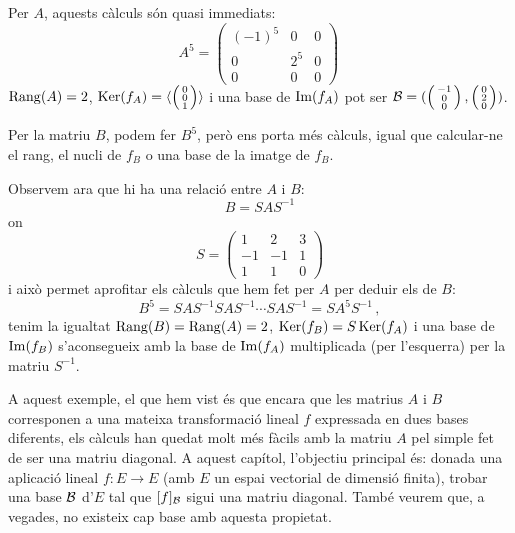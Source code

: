 \documentclass[
  11pt,
]{book}
\numberwithin{dummy}{section}
\theoremstyle{maincolornumbox}
\theoremstyle{blacknumex}
\theoremstyle{blacknumbox}
\theoremstyle{maincolornum}
\newlength\esp
\begin{document}
Per \(A\), aquests càlculs són quasi immediats: \[A^5=\begin{pmatrix}
(-1)^5 & 0 & 0 \\ 0 & 2^5 & 0 \\ 0 & 0 & 0
\end{pmatrix} \,\] \(\operatorname{Rang}(A)=2\),
\(\operatorname{Ker}(f_A)=\langle \left( \begin{smallmatrix} 0 \\ 0 \\ 1 \end{smallmatrix} \right) \rangle\)
i una base de \(\operatorname{Im}(f_A)\) pot ser
\(\mathcal{B}=( \left( \begin{smallmatrix} -1 \\ 0 \\ 0 \end{smallmatrix} \right) , \left( \begin{smallmatrix} 0 \\ 2 \\ 0 \end{smallmatrix} \right))\).

Per la matriu \(B\), podem fer \(B^5\), però ens porta més càlculs, igual
que calcular-ne el rang, el nucli de \(f_B\) o una base de la imatge de
\(f_B\).

Observem ara que hi ha una relació entre \(A\) i \(B\): \[B=S A S^{-1}\] on
\[S=\begin{pmatrix} 1 & 2 & 3 \\ -1 & -1 & 1 \\ 1 & 1 & 0
\end{pmatrix}\] i això permet aprofitar els càlculs que hem fet per \(A\)
per deduir els de \(B\):
\[B^5=S A S^{-1} S A S^{-1} \cdots S A S^{-1}=S A^5 S^{-1} \, ,\] tenim
la igualtat \(\operatorname{Rang}(B)=\operatorname{Rang}(A)=2\), \(\operatorname{Ker}(f_B)=S\operatorname{Ker}(f_A)\) i una base de
\(\operatorname{Im}(f_B)\) s'aconsegueix amb la base de \(\operatorname{Im}(f_A)\) multiplicada (per
l'esquerra) per la matriu \(S^{-1}\).

A aquest exemple, el que hem vist és que encara que les matrius \(A\) i
\(B\) corresponen a una mateixa transformació lineal \(f\) expressada en
dues bases diferents, els càlculs han quedat molt més fàcils amb la
matriu \(A\) pel simple fet de ser una matriu diagonal. A aquest capítol,
l'objectiu principal és: donada una aplicació lineal \(f\colon E \to E\)
(amb \(E\) un espai vectorial de dimensió finita), trobar una base \(\mathcal{B}\)
d'\(E\) tal que \([f]_{\mathcal{B}}\) sigui una matriu diagonal. També veurem que, a
vegades, no existeix cap base amb aquesta propietat.
\end{document}

